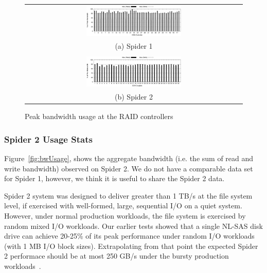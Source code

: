 \begin{figure}[!thb]
\begin{center}
\begin{tabular}{c}
{\includegraphics[width=0.450\textwidth]{./figs/spider1-bw-perc-max.eps}}\\
{(a) Spider 1}\\
\\
{\includegraphics[width=0.450\textwidth]{./figs/spider2-bw-perc-max.eps}}\\
{(b) Spider 2}\\
\end{tabular}
\vspace{-0.1in}
\caption{Peak bandwidth usage at the RAID controllers}
\label{fig:ddnpeakBW}
\end{center}
\end{figure}

\subsubsection{Spider 2 Usage Stats}

Figure~\ref{fig:bwUsage}, shows the aggregate bandwidth (i.e. the sum of read
and write bandwidth) observed on Spider 2. We do not have a comparable data set
for Spider 1, however, we think it is useful to share the Spider 2 data. 

Spider 2 system was designed to deliver greater than 1 TB/s at the file system level, 
if exercised with well-formed, large, sequential I/O on a quiet system. However, under
normal production workloads, the file system is exercised by random mixed I/O
workloads. Our earlier tests showed that a single NL-SAS disk drive can achieve
20-25\% of its peak performance under random I/O workloads (with 1 MB I/O block
sizes). Extrapolating from that point the expected Spider 2 performace should be 
at most 250 GB/s under the bursty production workloads~\cite{bestpractices}.


